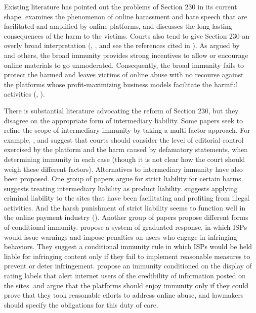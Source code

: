 Existing literature has pointed out the problems of Section 230 in its current shape. 
 examines the phenomenon of online harassment and hate speech that are facilitated and amplified by online platforms, and discusses the long-lasting consequences of the harm to the victims. 
Courts also tend to give Section 230 an overly broad interpretation (, , and see the references cited in ). 
As argued by  and others, the broad immunity provides strong incentives to allow or encourage online materials to go unmoderated. Consequently, the broad immunity fails to protect the harmed and leaves victims of online abuse with no recourse against the platforms whose profit-maximizing business models facilitate the harmful activities (, ).


There is substantial literature advocating the reform of Section 230, but they disagree on the appropriate form of intermediary liability.
Some papers seek to refine the scope of intermediary immunity by taking a multi-factor approach. For example, ,  and  suggest that courts should consider the level of editorial control exercised by the platform and the harm caused by defamatory statements, when determining immunity in each case (though it is not clear how the court should weigh these different factors).
Alternatives to intermediary immunity have also been proposed. 
One group of papers argue for strict liability for certain harms. 
 suggests treating intermediary liability as product liability.  suggests applying criminal liability to the sites that have been facilitating and profiting from illegal activities. And the harsh punishment of strict liability seems to function well in the online payment industry (). 
Another group of papers propose different forms of conditional immunity.
 propose a system of graduated response, in which ISPs would issue warnings and impose penalties on users who engage in infringing behaviors. They suggest a conditional immunity rule in which ISPs would be held liable for infringing content only if they fail to implement reasonable measures to prevent or deter infringement.
 propose an immunity conditioned on the display of rating labels that alert internet users of the credibility of information posted on the sites. 
 and  argue that the platforms should enjoy immunity only if they could prove that they took reasonable efforts to address online abuse, and lawmakers should specify the obligations for this duty of care. 



